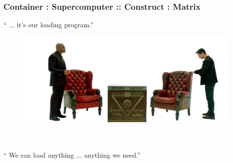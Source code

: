 \documentclass{beamer}
\begin{document}
\begin{frame}
   \frametitle{Container : Supercomputer :: Construct : Matrix}
   `` ... it's our loading program.''
   \begin{figure}[htbp]
      \includegraphics[width=1.0\textwidth]{images/the-matrix-construct3.jpg}
   \end{figure}
   \ \\ \ \\
   \hspace{3cm} `` We can load anything ... anything we need.''
\end{frame}
\end{document}
